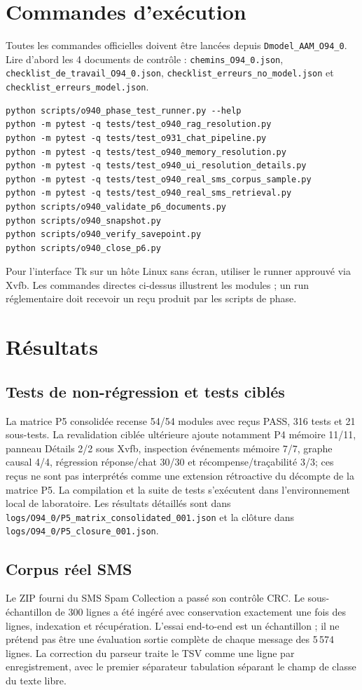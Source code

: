 \documentclass[11pt,a4paper]{article}
\begin{document}
\section{Commandes d'exécution}
Toutes les commandes officielles doivent être lancées depuis \texttt{Dmodel\_AAM\_O94\_0}. Lire d'abord les 4 documents de contrôle : \texttt{chemins\_O94\_0.json}, \texttt{checklist\_de\_travail\_O94\_0.json}, \texttt{checklist\_erreurs\_no\_model.json} et \texttt{checklist\_erreurs\_model.json}.

\begin{verbatim}
python scripts/o940_phase_test_runner.py --help
python -m pytest -q tests/test_o940_rag_resolution.py
python -m pytest -q tests/test_o931_chat_pipeline.py
python -m pytest -q tests/test_o940_memory_resolution.py
python -m pytest -q tests/test_o940_ui_resolution_details.py
python -m pytest -q tests/test_o940_real_sms_corpus_sample.py
python -m pytest -q tests/test_o940_real_sms_retrieval.py
python scripts/o940_validate_p6_documents.py
python scripts/o940_snapshot.py
python scripts/o940_verify_savepoint.py
python scripts/o940_close_p6.py
\end{verbatim}
Pour l'interface Tk sur un hôte Linux sans écran, utiliser le runner approuvé via Xvfb. Les commandes directes ci-dessus illustrent les modules ; un run réglementaire doit recevoir un reçu produit par les scripts de phase.

\section{Résultats}
\subsection{Tests de non-régression et tests ciblés}
La matrice P5 consolidée recense 54/54 modules avec reçus PASS, 316 tests et 21 sous-tests. La revalidation ciblée ultérieure ajoute notamment P4 mémoire 11/11, panneau Détails 2/2 sous Xvfb, inspection événements mémoire 7/7, graphe causal 4/4, régression réponse/chat 30/30 et récompense/traçabilité 3/3; ces reçus ne sont pas interprétés comme une extension rétroactive du décompte de la matrice P5. La compilation et la suite de tests s'exécutent dans l'environnement local de laboratoire. Les résultats détaillés sont dans \texttt{logs/O94\_0/P5\_matrix\_consolidated\_001.json} et la clôture dans \texttt{logs/O94\_0/P5\_closure\_001.json}.

\subsection{Corpus réel SMS}
Le ZIP fourni du SMS Spam Collection a passé son contrôle CRC. Le sous-échantillon de 300 lignes a été ingéré avec conservation exactement une fois des lignes, indexation et récupération. L'essai end-to-end est un échantillon ; il ne prétend pas être une évaluation sortie complète de chaque message des 5\,574 lignes. La correction du parseur traite le TSV comme une ligne par enregistrement, avec le premier séparateur tabulation séparant le champ de classe du texte libre.
\end{document}

